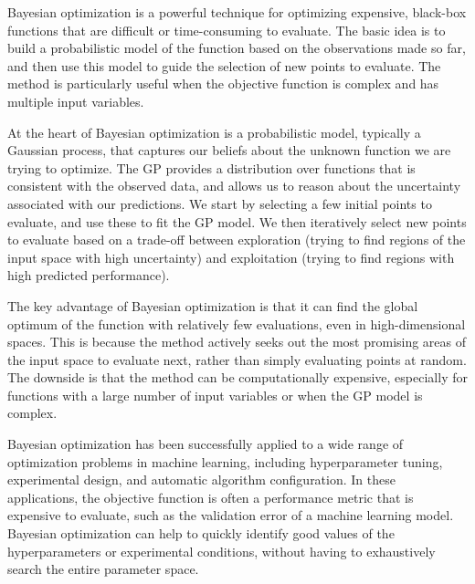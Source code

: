 \documentclass{IOS-Book-Article}
\begin{document}
	Bayesian optimization is a powerful technique for optimizing expensive, black-box functions that are difficult or time-consuming to evaluate. The basic idea is to build a probabilistic model of the function based on the observations made so far, and then use this model to guide the selection of new points to evaluate. The method is particularly useful when the objective function is complex and has multiple input variables.
	
	At the heart of Bayesian optimization is a probabilistic model, typically a Gaussian process, that captures our beliefs about the unknown function we are trying to optimize. The GP provides a distribution over functions that is consistent with the observed data, and allows us to reason about the uncertainty associated with our predictions. We start by selecting a few initial points to evaluate, and use these to fit the GP model. We then iteratively select new points to evaluate based on a trade-off between exploration (trying to find regions of the input space with high uncertainty) and exploitation (trying to find regions with high predicted performance).
	
	The key advantage of Bayesian optimization is that it can find the global optimum of the function with relatively few evaluations, even in high-dimensional spaces. This is because the method actively seeks out the most promising areas of the input space to evaluate next, rather than simply evaluating points at random. The downside is that the method can be computationally expensive, especially for functions with a large number of input variables or when the GP model is complex.
	
	Bayesian optimization has been successfully applied to a wide range of optimization problems in machine learning, including hyperparameter tuning, experimental design, and automatic algorithm configuration. In these applications, the objective function is often a performance metric that is expensive to evaluate, such as the validation error of a machine learning model. Bayesian optimization can help to quickly identify good values of the hyperparameters or experimental conditions, without having to exhaustively search the entire parameter space.
	
\end{document}
